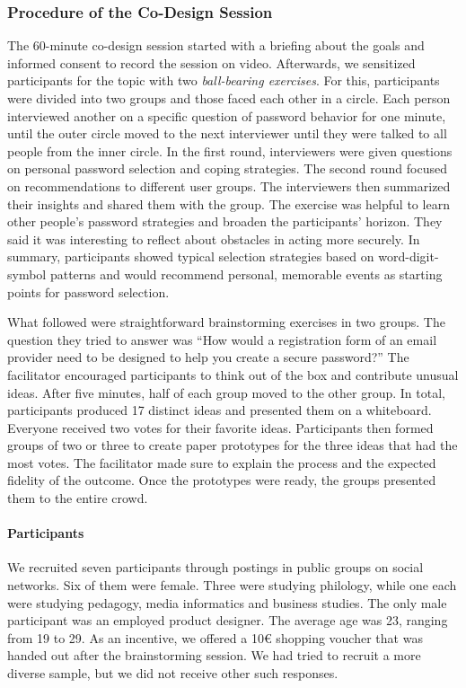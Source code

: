 \subsubsection{Procedure of the Co-Design Session}
The 60-minute co-design session started with a briefing about the goals and informed consent to record the session on video. Afterwards, we sensitized participants for the topic with two \textit{ball-bearing exercises}. For this, participants were divided into two groups and those faced each other in a circle. Each person interviewed another on a specific question of password behavior for one minute, until the outer circle moved to the next interviewer until they were talked to all people from the inner circle. In the first round, interviewers were given questions on personal password selection and coping strategies. The second round focused on recommendations to different user groups. The interviewers then summarized their insights and shared them with the group. The exercise was helpful to learn other people's password strategies and broaden the participants' horizon. They said it was interesting to reflect about obstacles in acting more securely. In summary, participants showed typical selection strategies based on word-digit-symbol patterns and would recommend personal, memorable events as starting points for password selection.

What followed were straightforward brainstorming exercises in two groups. The question they tried to answer was ``How would a registration form of an email provider need to be designed to help you create a secure password?'' The facilitator encouraged participants to think out of the box and contribute unusual ideas. After five minutes, half of each group moved to the other group. In total, participants produced 17 distinct ideas and presented them on a whiteboard. Everyone received two votes for their favorite ideas. Participants then formed groups of two or three to create paper prototypes for the three ideas that had the most votes. The facilitator made sure to explain the process and the expected fidelity of the outcome. Once the prototypes were ready, the groups presented them to the entire crowd.

\paragraph{Participants}
We recruited seven participants through postings in public groups on social networks. Six of them were female. Three were studying philology, while one each were studying pedagogy, media informatics and business studies. The only male participant was an employed product designer. The average age was 23, ranging from 19 to 29. As an incentive, we offered a 10€ shopping voucher that was handed out after the brainstorming session. We had tried to recruit a more diverse sample, but we did not receive other such responses. 

